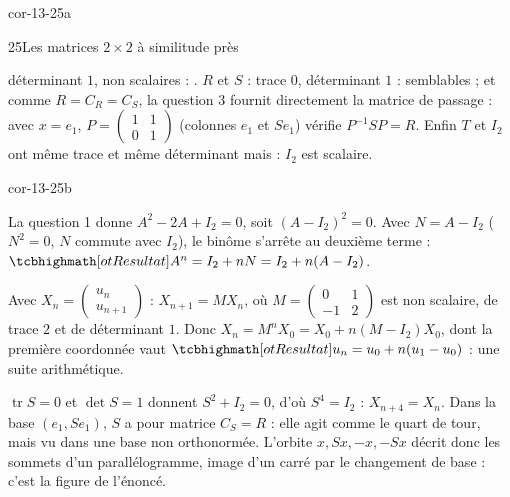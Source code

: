 \begin{blocLivre}{cor-13-25a}
\begin{corrige}{25}{Les matrices $2\times2$ à similitude près}
\begin{questions}[resume]
    déterminant $1$, non scalaires : . $R$ et $S$ :
    trace $0$, déterminant $1$ : semblables ; et comme $R=C_R=C_S$, la
    question 3 fournit directement la matrice de passage : avec $x=e_1$,
    $P=\begin{pmatrix}1&1\\0&1\end{pmatrix}$ (colonnes $e_1$ et $Se_1$)
    vérifie $P^{-1}SP=R$. Enfin $T$ et $I_2$ ont même trace et même
    déterminant mais  : $I_2$ est
    scalaire.
\end{questions}
\end{corrige}
\end{blocLivre}

\begin{blocLivre}{cor-13-25b}
\begin{corrigeSuite}
\begin{questions}[start=6]
  \item La question 1 donne $A^{2}-2A+I_2=0$, soit $(A-I_2)^{2}=0$. Avec
    $N=A-I_2$ ($N^{2}=0$, $N$ commute avec $I_2$), le binôme s'arrête au
    deuxième terme : $\res{A^{n}=I_2+nN=I_2+n(A-I_2)}$.
  \item Avec $X_n=\begin{pmatrix}u_n\\u_{n+1}\end{pmatrix}$ :
    $X_{n+1}=MX_n$, où $M=\begin{pmatrix}0&1\\-1&2\end{pmatrix}$ est non
    scalaire, de trace $2$ et de déterminant $1$. Donc
    $X_n=M^{n}X_0=X_0+n(M-I_2)X_0$, dont la première coordonnée vaut
    $\res{u_n=u_0+n(u_1-u_0)}$ : une suite arithmétique.
  \item $\operatorname{tr}S=0$ et $\det S=1$ donnent $S^{2}+I_2=0$, d'où
    $S^{4}=I_2$ : $X_{n+4}=X_n$. Dans la base $(e_1,Se_1)$, $S$ a pour
    matrice $C_S=R$ : elle agit comme le quart de tour, mais vu dans une
    base non orthonormée. L'orbite $x,Sx,-x,-Sx$ décrit donc les sommets
    d'un parallélogramme, image d'un carré par le changement de base :
    c'est la figure de l'énoncé.
\end{questions}
\end{corrigeSuite}
\end{blocLivre}
